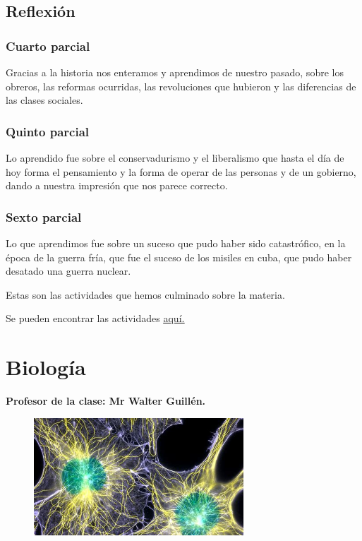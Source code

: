 \documentclass[a4paper, 12pt]{article}
\begin{document}
\subsection{Reflexión}

\subsubsection{Cuarto parcial}
Gracias a la historia nos enteramos y aprendimos de nuestro pasado, sobre los obreros, las reformas ocurridas, las revoluciones que hubieron y las diferencias de las clases sociales.

\subsubsection{Quinto parcial}
Lo aprendido fue sobre el conservadurismo y el liberalismo que hasta el día de hoy forma el pensamiento y la forma de operar de las personas y de un gobierno, dando a nuestra impresión que nos parece correcto.

\subsubsection{Sexto parcial}
Lo que aprendimos fue sobre un suceso que pudo haber sido catastrófico, en la época de la guerra fría, que fue el suceso de los misiles en cuba, que pudo haber desatado una guerra nuclear.

Estas son las actividades que hemos culminado sobre la materia.

Se pueden encontrar las actividades \href{https://drive.google.com/drive/folders/1J-HMvcP6JzfQoPtuu-0Y0o9HO8xSQonl?usp=sharing}{\underline{aquí.}}

\section{Biología}
\textbf{Profesor de la clase: Mr Walter Guillén.}

\begin{figure}[h]
  \includegraphics[width=0.7\textwidth, center]{biologia.jpeg}
\end{figure}
\end{document}
